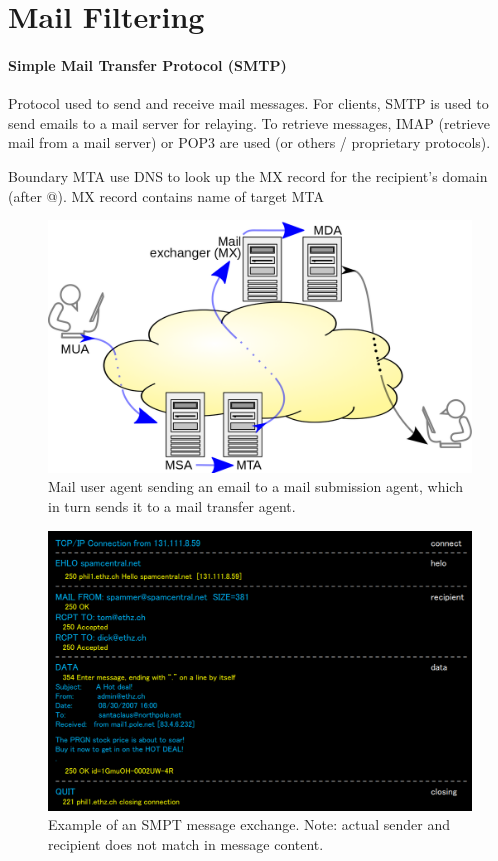 \section{Mail Filtering}

\paragraph{Simple Mail Transfer Protocol (SMTP)}
Protocol used to send and receive mail messages. For clients, SMTP is used to send emails to a mail server for relaying. To retrieve messages, IMAP (retrieve mail from a mail server) or POP3 are used (or others / proprietary protocols).

Boundary MTA use DNS to look up the MX record for the recipient's domain (after @). MX record contains name of target MTA

\begin{figure}[h]
	\centering
	\includegraphics[scale=0.15]{images/916-smtp.png}
	\caption{Mail user agent sending an email to a mail submission agent, which in turn sends it to a mail transfer agent.}
	\label{fig:smtp}
\end{figure}

\begin{figure}[h]
	\centering
	\includegraphics[scale=0.5]{images/916-session.PNG}
	\caption{Example of an SMPT message exchange. Note: actual sender and recipient does not match in message content.}
	\label{fig:session}
\end{figure}

